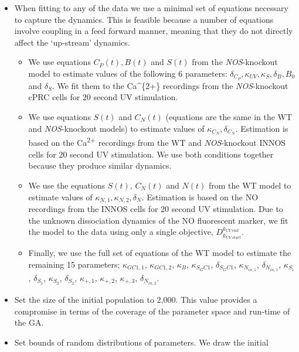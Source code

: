 \documentclass[
  11pt,
  letterpaper,
  DIV=11,
  numbers=noendperiod]{scrartcl}
\providecommand{\tightlist}{%
  \setlength{\itemsep}{0pt}\setlength{\parskip}{0pt}}
\begin{document}
\begin{itemize}
\tightlist
\item
  When fitting to any of the data we use a minimal set of equations
  necessary to capture the dynamics. This is feasible because a number
  of equations involve coupling in a feed forward manner, meaning that
  they do not directly affect the `up-stream' dynamics.

  \begin{itemize}
  \tightlist
  \item
    We use equations \(C_P(t), B(t)\) and \(S(t)\) from the
    \emph{NOS}-knockout model to estimate values of the following 6
    parameters: \(\delta_{C_P}, \kappa_{UV}, \kappa_S, \delta_{B}, B_0\)
    and \(\delta_S\). We fit them to the Ca\^{}\{2+\} recordings from
    the \emph{NOS}-knockout cPRC cells for 20 second UV stimulation.
  \item
    We use equations \(S(t)\) and \(C_N(t)\) (equations are the same in
    the WT and \emph{NOS}-knockout models) to estimate values of
    \(\kappa_{C_N}, \delta_{C_N}\). Estimation is based on the
    Ca\textsuperscript{2+} recordings from the WT and
    \emph{NOS}-knockout INNOS cells for 20 second UV stimulation. We use
    both conditions together because they produce similar dynamics.
  \item
    We use the equations \(S(t)\), \(C_N(t)\) and \(N(t)\) from the WT
    model to estimate values of
    \(\kappa_{N,1}, \kappa_{N,2}, \delta_N\). Estimation is based on the
    NO recordings from the INNOS cells for 20 second UV stimulation. Due
    to the unknown dissociation dynamics of the NO fluorescent marker,
    we fit the model to the data using only a single objective,
    \(D_{k_{UV\: start}}^{k_{UV\: end}}\).
  \item
    Finally, we use the full set of equations of the WT model to
    estimate the remaining 15 parameters; \(\kappa_{GC1,1}\),
    \(\kappa_{GC1,2}\), \(\kappa_B\), \(\kappa_{S_GC1}\),
    \(\delta_{S_GC1}\), \(\kappa_{N_{in,1}}\), \(\delta_{N_{in,1}}\),
    \(\kappa_{S_1}\), \(\delta_{S_1}\), \(\kappa_{S_2}\),
    \(\delta_{S_2}\), \(\kappa_{+,1}\), \(\kappa_{+,2}\),
    \(\kappa_{+,3}\), \(\delta_{N_{in,2}}\).
  \end{itemize}
\item
  Set the size of the initial population to 2,000. This value provides a
  compromise in terms of the coverage of the parameter space and
  run-time of the GA.
\item
  Set bounds of random distributions of parameters. We draw the initial

\end{itemize}
\end{document}
